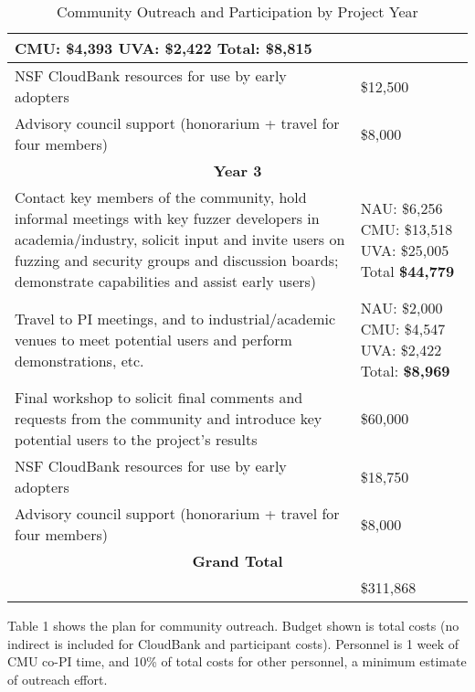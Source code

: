 \documentclass[12pt]{article}
\begin{document}
\begin{table}
\begin{tabular}{|p{12cm}|p{3cm}|}
                                                       CMU: \$4,393
                                                       UVA:  \$2,422
                                                       Total: \textbf{\$8,815}\\
    \hline
    NSF CloudBank resources for use by early adopters & \$12,500 \\
    \hline 
    Advisory council support (honorarium + travel for four members) & \$8,000 \\    
    \hline
    \hline
    \multicolumn{2}{c}{{\bf Year 3}} \\
    \hline
    \hline
   Contact key members of the community, hold informal meetings with
    key fuzzer developers in academia/industry, solicit input and
    invite users
    on fuzzing and security groups and discussion boards; demonstrate
    capabilities and assist early users) &  NAU:  \$6,256 CMU: \$13,518 UVA: \$25,005
                                                      Total \textbf{ \$44,779} \\
    \hline
    Travel to PI meetings, and to industrial/academic venues to meet
    potential users and perform demonstrations, etc. & NAU: \$2,000
                                                       CMU: \$4,547
                                                       UVA:  \$2,422
                                                       Total: \textbf{\$8,969}\\
    \hline    
    Final workshop to solicit final comments and requests from the
    community and introduce key potential users to the project’s
    results & \$60,000 \\
    \hline
    NSF CloudBank resources for use by early adopters & \$18,750 \\
    \hline 
    Advisory council support (honorarium + travel for four members) & \$8,000 \\    
    \hline
    \hline
    \multicolumn{2}{c}{{\bf Grand Total}} \\
    \hline
                   &     \$311,868 \\
                     \hline
 
  \end{tabular}
\label{outreach}
  \caption{Community Outreach and Participation by Project Year}
  
\end{table}


Table 1 shows the plan for community
outreach.   Budget shown is total costs 
 (no indirect is included for CloudBank and participant costs).   Personnel is 1 week of CMU co-PI time, and 10\%
of total costs for other personnel, a
minimum estimate of outreach effort.
\end{document}
